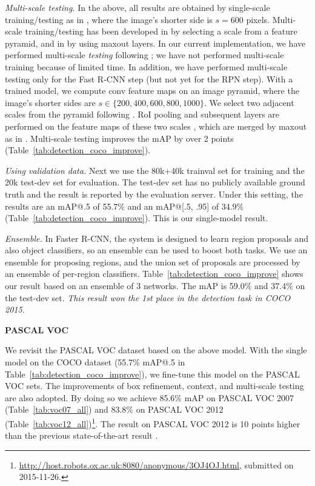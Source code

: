 \vspace{.5em}
\noindent\emph{Multi-scale testing.} In the above, all results are obtained by single-scale training/testing as in \cite{Ren2015}, where the image's shorter side is $s=600$ pixels. Multi-scale training/testing has been developed in \cite{He2014,Girshick2015} by selecting a scale from a feature pyramid, and in \cite{Ren2015a} by using maxout layers. In our current implementation, we have performed multi-scale \emph{testing} following \cite{Ren2015a}; we have not performed multi-scale training because of limited time. In addition, we have performed multi-scale testing only for the Fast R-CNN step (but not yet for the RPN step).
With a trained model, we compute conv feature maps on an image pyramid, where the image's shorter sides are $s\in\{200, 400, 600, 800, 1000\}$. We select two adjacent scales from the pyramid following \cite{Ren2015a}. RoI pooling and subsequent layers are performed on the feature maps of these two scales \cite{Ren2015a}, which are merged by maxout as in \cite{Ren2015a}.
Multi-scale testing improves the mAP by over 2 points (Table~\ref{tab:detection_coco_improve}).

\vspace{.5em}
\noindent\emph{Using validation data.} Next we use the 80k+40k trainval set for training and the 20k test-dev set for evaluation. The test-dev set has no publicly available ground truth and the result is reported by the evaluation server. Under this setting, the results are an mAP@.5 of 55.7\% and an mAP@[.5, .95] of 34.9\% (Table~\ref{tab:detection_coco_improve}). This is our single-model result.

\vspace{.5em}
\noindent\emph{Ensemble.} In Faster R-CNN, the system is designed to learn region proposals and also object classifiers, so an ensemble can be used to boost both tasks. We use an ensemble for proposing regions, and the union set of proposals are processed by an ensemble of per-region classifiers.
Table~\ref{tab:detection_coco_improve} shows our result based on an ensemble of 3 networks. The mAP is 59.0\% and 37.4\% on the test-dev set. \emph{This result won the 1st place in the detection task in COCO 2015.}


\vspace{1em}
\noindent\textbf{PASCAL VOC}

We revisit the PASCAL VOC dataset based on the above model. With the single model on the COCO dataset (55.7\% mAP@.5 in Table~\ref{tab:detection_coco_improve}), we fine-tune this model on the PASCAL VOC sets. The improvements of box refinement, context, and multi-scale testing are also adopted. By doing so we achieve 85.6\% mAP on PASCAL VOC 2007 (Table~\ref{tab:voc07_all}) and 83.8\% on PASCAL VOC 2012 (Table~\ref{tab:voc12_all})\footnote{\fontsize{6.5pt}{1em}\selectfont\url{http://host.robots.ox.ac.uk:8080/anonymous/3OJ4OJ.html}, submitted on 2015-11-26.}. The result on PASCAL VOC 2012 is 10 points higher than the previous state-of-the-art result \cite{Gidaris2015}.


